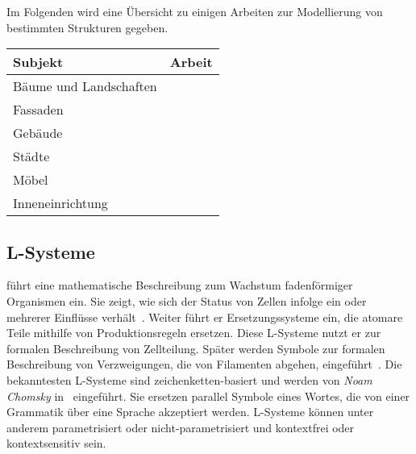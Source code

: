 Im Folgenden wird eine Übersicht zu einigen Arbeiten zur Modellierung von bestimmten Strukturen gegeben.
\begin{center}
    \begin{tabular}{ll}
        Subjekt & Arbeit\\
        \hline
        Bäume und Landschaften & ~\cite{deussen_2010} \\
        Fassaden & ~\cite{alhalawani_2013} \\
        Gebäude & ~\cite{mueller_2006} \\
        Städte & ~\cite{parish_2001} \\
        Möbel & ~\cite{merrell_2011} \\
        Inneneinrichtung & ~\cite{zhang_2019} \\
    \end{tabular}
\end{center}

\subsection*{L-Systeme}
\citeauthor{lindemayer_1968} führt eine mathematische Beschreibung zum Wachstum fadenförmiger Organismen ein.
Sie zeigt, wie sich der Status von Zellen infolge ein oder mehrerer Einflüsse verhält~\cite{lindemayer_1968}.
Weiter führt er Ersetzungssysteme ein, die atomare Teile mithilfe von Produktionsregeln ersetzen.
Diese L-Systeme nutzt er zur formalen Beschreibung von Zellteilung.
Später werden Symbole zur formalen Beschreibung von Verzweigungen, die von Filamenten abgehen, eingeführt~\cite{prusinkiewicz_1990}.
Die bekanntesten L-Systeme sind zeichenketten-basiert und werden von \textit{Noam Chomsky} in~\cite{chomsky_1956} eingeführt.
Sie ersetzen parallel Symbole eines Wortes, die von einer Grammatik über eine Sprache akzeptiert werden.
L-Systeme können unter anderem parametrisiert oder nicht-parametrisiert und kontextfrei oder kontextsensitiv sein.

\newpage

